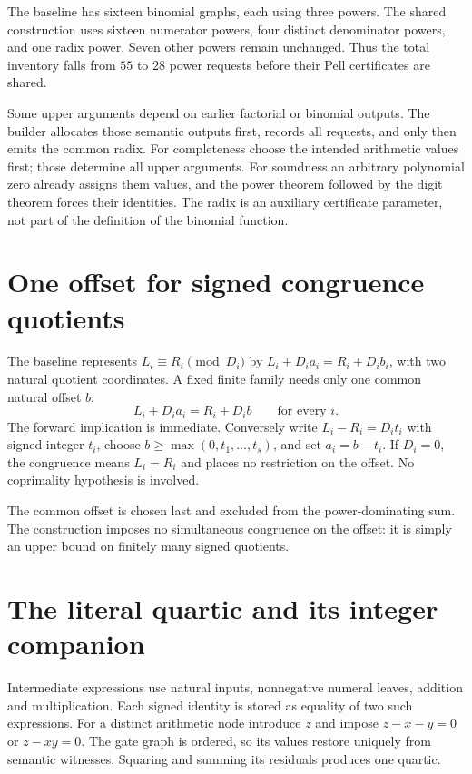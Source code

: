 \documentclass[11pt,letterpaper]{article}
\begin{document}
The baseline has sixteen binomial graphs, each using three
powers. The shared construction uses sixteen numerator powers,
four distinct denominator powers, and one radix power.
Seven other powers remain unchanged. Thus the total inventory
falls from $55$ to $28$ power requests before their Pell
certificates are shared.

Some upper arguments depend on earlier factorial or binomial
outputs. The builder allocates those semantic outputs first,
records all requests, and only then emits the common radix.
For completeness choose the intended arithmetic values first;
those determine all upper arguments. For soundness an
arbitrary polynomial zero already assigns them values, and
the power theorem followed by the digit theorem forces their
identities. The radix is an auxiliary certificate parameter,
not part of the definition of the binomial function.

\section{One offset for signed congruence quotients}
\label{sec:offset}

The baseline represents $L_i\equiv R_i\pmod{D_i}$ by
$L_i+D_i a_i=R_i+D_i b_i$, with two natural quotient
coordinates. A fixed finite family needs only one common
natural offset $b$:
\begin{equation}
 L_i+D_i a_i=R_i+D_i b\qquad\text{for every }i.
\label{eq:shared-offset}
\end{equation}
The forward implication is immediate. Conversely write
$L_i-R_i=D_i t_i$ with signed integer $t_i$, choose
$b\ge\max(0,t_1,\ldots,t_s)$, and set $a_i=b-t_i$.
If $D_i=0$, the congruence means $L_i=R_i$ and places
no restriction on the offset. No coprimality hypothesis
is involved.

The common offset is chosen last and excluded from the
power-dominating sum. The construction imposes no
simultaneous congruence on the offset: it is simply an
upper bound on finitely many signed quotients.




\section{The literal quartic and its integer companion}
\label{sec:flatten}

Intermediate expressions use natural inputs, nonnegative
numeral leaves, addition and multiplication. Each signed
identity is stored as equality of two such expressions.
For a distinct arithmetic node introduce $z$ and impose
$z-x-y=0$ or $z-xy=0$. The gate graph is ordered, so its
values restore uniquely from semantic witnesses.
Squaring and summing its residuals produces one quartic.
\end{document}
